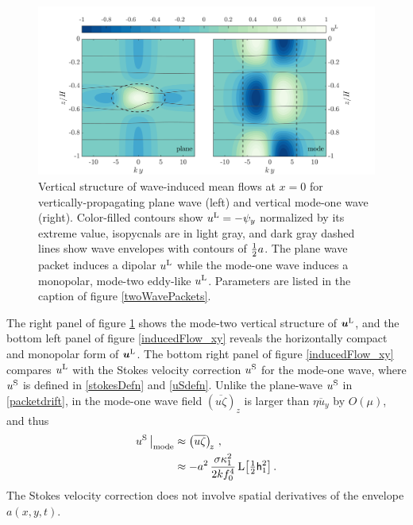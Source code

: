 \documentclass[12pt, oneside]{book}
\begin{document}
\begin{figure}
\centering
\includegraphics[width = 1\textwidth]{inducedFlow_xz}
\caption[Vertical structure of wave-induced mean flows]{Vertical structure of wave-induced mean flows at $x=0$ for vertically-propagating plane wave (left) and vertical mode-one wave (right).  Color-filled contours show $u^{\mathrm{L}}=-\psi_y$ normalized by its extreme value, isopycnals are in light gray, and dark gray dashed lines show wave envelopes with contours of $\tfrac{1}{2} a$.  The plane wave packet induces a dipolar $u^{\mathrm{L}}$ while the mode-one wave induces a monopolar, mode-two eddy-like $u^{\mathrm{L}}$. Parameters are listed in the caption of figure \ref{twoWavePackets}.}
\label{inducedFlow_xz}
\end{figure}

The right panel of figure \ref{inducedFlow_xz} shows the mode-two vertical structure of $\boldsymbol{u}^{\mathrm{L}}$, and the bottom left panel of figure \ref{inducedFlow_xy} reveals the horizontally compact and monopolar form of $\boldsymbol{u}^{\mathrm{L}}$.  The bottom right panel of figure \ref{inducedFlow_xy} compares $u^{\mathrm{L}}$ with the Stokes velocity correction $u^{\mathrm{S}}$ for the mode-one wave, where $u^{\mathrm{S}}$ is defined in \eqref{stokesDefn} and \eqref{uSdefn}.  Unlike  the plane-wave $u^{\mathrm{S}}$ in \eqref{packetdrift}, in the mode-one wave field $(\overline{u \zeta})_{ z}$ is larger than $\overline{\eta u_y}$ by $O(\mu)$, and thus
\begin{align}
u^{\mathrm{S}} \,  \big |_{\mathrm{mode}} &\approx \left ( \overline{u \zeta} \right )_{\! z} \, , \\
&\approx - a^2 \, \frac{\sigma \kappa_1^2}{2 k f_0^4} \, \mathrm{L} \big [ \tfrac{1}{2} \mathsf{h}_1^2 \big ] \, . 
\end{align}
The Stokes velocity correction does not involve spatial derivatives of the envelope $a(x,y,t)$.
\end{document}
